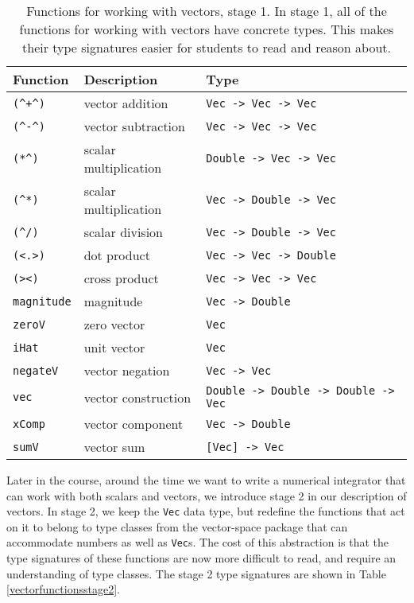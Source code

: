 \documentclass[11pt]{article}
\begin{document}
\begin{table}
\begin{center}
\begin{tabular}{lll}
Function      & Description           & Type \\ \hline
\verb|(^+^)| & vector addition       & \verb|Vec -> Vec -> Vec| \\
\verb|(^-^)| & vector subtraction    & \verb|Vec -> Vec -> Vec| \\
\verb|(*^)|  & scalar multiplication & \verb|Double -> Vec -> Vec| \\
\verb|(^*)|  & scalar multiplication & \verb|Vec -> Double -> Vec| \\
\verb|(^/)|  & scalar division       & \verb|Vec -> Double -> Vec| \\
\verb|(<.>)| & dot product           & \verb|Vec -> Vec -> Double| \\
\verb|(><)|  & cross product         & \verb|Vec -> Vec -> Vec| \\
\verb|magnitude| & magnitude        & \verb|Vec -> Double| \\
\verb|zeroV| & zero vector          & \verb|Vec| \\
\verb|iHat|  & unit vector           & \verb|Vec| \\
\verb|negateV| & vector negation    & \verb|Vec -> Vec| \\
\verb|vec|  & vector construction    & \verb|Double -> Double -> Double -> Vec| \\
\verb|xComp|  & vector component    & \verb|Vec -> Double| \\
\verb|sumV|   & vector sum          & \verb|[Vec] -> Vec| \\
\end{tabular}
\end{center}
\caption{Functions for working with vectors, stage 1.
In stage 1, all of the functions for working with vectors have concrete types.
This makes their type signatures easier for students to read and reason about.
}
\label{vectorfunctions}
\end{table}

Later in the course, around the time we want to write a numerical integrator that can
work with both scalars and vectors, we introduce stage 2 in our description of
vectors.  In stage 2, we keep the \verb|Vec| data type, but redefine the functions
that act on it to belong to type classes from the vector-space package\cite{vector-space}
that can accommodate numbers as well as
\verb|Vec|s.  The cost of this abstraction is that the type signatures of these functions are now 
more difficult to read, and require an understanding of type classes.
The stage 2 type signatures are shown in Table \ref{vectorfunctionsstage2}.
\end{document}
